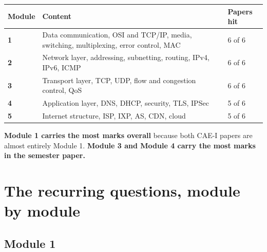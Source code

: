 \documentclass[11pt,a4paper]{article}
\begin{document}
\begin{center}\small
\begin{tabularx}{\textwidth}{>{\bfseries}p{} X p{}}
\toprule Module & Content & Papers hit\\
\midrule
1 & Data communication, OSI and TCP/IP, media, switching, multiplexing, error control, MAC & 6 of 6\\
2 & Network layer, addressing, subnetting, routing, IPv4, IPv6, ICMP & 6 of 6\\
3 & Transport layer, TCP, UDP, flow and congestion control, QoS & 6 of 6\\
4 & Application layer, DNS, DHCP, security, TLS, IPSec & 5 of 6\\
5 & Internet structure, ISP, IXP, AS, CDN, cloud & 5 of 6\\
\bottomrule
\end{tabularx}
\end{center}

\textbf{Module 1 carries the most marks overall} because both CAE-I papers are almost entirely Module 1. \textbf{Module 3 and Module 4 carry the most marks in the semester paper.}

\section{The recurring questions, module by module}

\subsection{Module 1}
\end{document}

